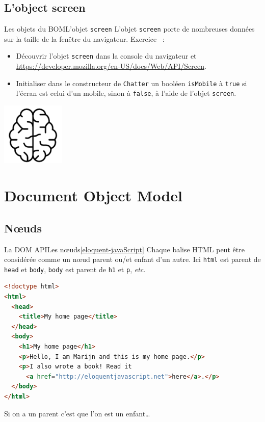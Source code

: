 \documentclass{beamer}
\begin{document}
    \subsection{L'object screen}\label{subsec:screen}

    \begin{frame}[fragile]{Les objets du BOM}{L'objet \lstinline{screen}}
        L'objet \lstinline{screen} porte de nombreuses données sur la taille de la fenêtre du navigateur.
        \bigbreak
        Exercice \execcounterdispinc{}~:
        \begin{itemize}
            \item Découvrir l'objet \lstinline{screen} dans la console du navigateur et \url{https://developer.mozilla.org/en-US/docs/Web/API/Screen}.
            \item Initialiser dans le constructeur de \lstinline{Chatter} un booléen \lstinline{isMobile} à \lstinline{true} si l'écran est celui d'un mobile, sinon à \lstinline{false}, à l'aide de l'objet \lstinline{screen}.
        \end{itemize}
        \begin{center}
            \includegraphics[width=3cm]{image/intelligence}
        \end{center}
    \end{frame}


    \section{Document Object Model}\label{sec:dom}

    \subsection{Nœuds}\label{sucsec:nodes}

    \begin{frame}[fragile]{La DOM API}{Les nœuds\cref{eloquent-javaScript}}
        Chaque balise HTML peut être considérée comme un nœud parent ou/et enfant d'un autre.
        \bigbreak
        Ici \lstinline{html} est parent de \lstinline{head} et \lstinline{body}, \lstinline{body} est parent de \lstinline{h1} et \lstinline{p}, \textit{etc}.
        \begin{lstlisting}[language=HTML,title={\tiny{HTML}}]
<!doctype html>
<html>
  <head>
    <title>My home page</title>
  </head>
  <body>
    <h1>My home page</h1>
    <p>Hello, I am Marijn and this is my home page.</p>
    <p>I also wrote a book! Read it
      <a href="http://eloquentjavascript.net">here</a>.</p>
  </body>
</html>
        \end{lstlisting}
        Si on a un parent c'est que l'on est un enfant\ldots
    \end{frame}
\end{document}
